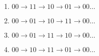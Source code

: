 \documentclass[10pt,-letter paper]{article}
\begin{document}
\begin{enumerate}[label=\Alph*.]
\item $00 \rightarrow 11 \rightarrow 10 \rightarrow 01 \rightarrow 00 \hdots $
\item $00 \rightarrow 01 \rightarrow 10 \rightarrow 11 \rightarrow 00 \hdots $
\item $00 \rightarrow 01 \rightarrow 11 \rightarrow 10 \rightarrow 00 \hdots $
\item $00 \rightarrow 10 \rightarrow 11 \rightarrow 01 \rightarrow 00 \hdots $
\end{enumerate}
\end{document}
